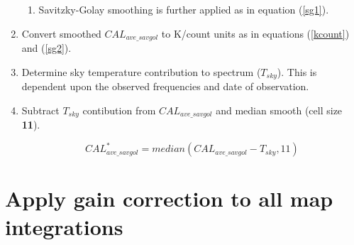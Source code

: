 \documentclass[11pt]{article}
\begin{document}
\begin{enumerate}
\begin{enumerate}
\item Savitzky-Golay smoothing is further applied as in equation (\ref{sg1}).

\end{enumerate}

\item Convert smoothed $CAL_{ave\_savgol}$ to K/count units as in equations (\ref{kcount}) and (\ref{sg2}).

\item Determine sky temperature contribution to spectrum ($T_{sky}$).
This is dependent upon the observed frequencies and date of observation.

\item Subtract $T_{sky}$ contibution from $CAL_{ave\_savgol}$ and median smooth (cell size {\bf 11}).

\begin{equation}
CAL^{*}_{ave\_savgol} = median(CAL_{ave\_savgol} - T_{sky},11)
\end{equation}


\end{enumerate}

\section{Apply gain correction to all map integrations}
\end{document}
